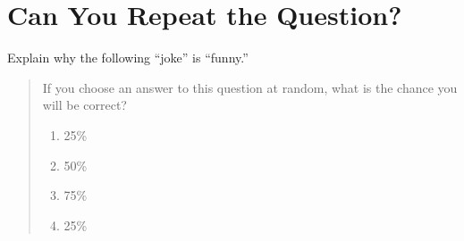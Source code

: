 \newpage
\section{Can You Repeat the Question?}


Explain why the following ``joke'' is ``funny.''
\begin{quote}
If you choose an answer to this question at random, what is the chance you will be correct?
\begin{enumerate}
\item 25\%
\item 50\%
\item 75\%
\item 25\%
\end{enumerate}
\end{quote}


